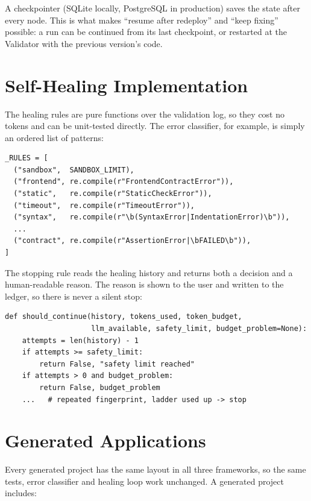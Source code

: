 \documentclass[12pt,a4paper]{report}
\begin{document}
A checkpointer (SQLite locally, PostgreSQL in production) saves the state after every node. This is what makes ``resume after redeploy'' and ``keep fixing'' possible: a run can be continued from its last checkpoint, or restarted at the Validator with the previous version's code.

\section{Self-Healing Implementation}

The healing rules are pure functions over the validation log, so they cost no tokens and can be unit-tested directly. The error classifier, for example, is simply an ordered list of patterns:

\begin{singlespace}
\begin{verbatim}
_RULES = [
  ("sandbox",  SANDBOX_LIMIT),
  ("frontend", re.compile(r"FrontendContractError")),
  ("static",   re.compile(r"StaticCheckError")),
  ("timeout",  re.compile(r"TimeoutError")),
  ("syntax",   re.compile(r"\b(SyntaxError|IndentationError)\b")),
  ...
  ("contract", re.compile(r"AssertionError|\bFAILED\b")),
]
\end{verbatim}
\end{singlespace}

The stopping rule reads the healing history and returns both a decision and a human-readable reason. The reason is shown to the user and written to the ledger, so there is never a silent stop:

\begin{singlespace}
\begin{verbatim}
def should_continue(history, tokens_used, token_budget,
                    llm_available, safety_limit, budget_problem=None):
    attempts = len(history) - 1
    if attempts >= safety_limit:
        return False, "safety limit reached"
    if attempts > 0 and budget_problem:
        return False, budget_problem
    ...   # repeated fingerprint, ladder used up -> stop
\end{verbatim}
\end{singlespace}

\section{Generated Applications}

Every generated project has the same layout in all three frameworks, so the same tests, error classifier and healing loop work unchanged. A generated project includes:
\end{document}
